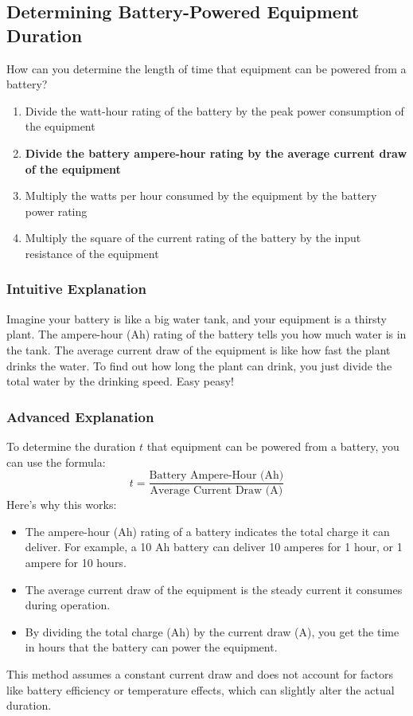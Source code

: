 \subsection{Determining Battery-Powered Equipment Duration}
\label{T4A09}

\begin{tcolorbox}[colback=gray!10!white,colframe=black!75!black,title=T4A09]
How can you determine the length of time that equipment can be powered from a battery?
\begin{enumerate}[label=\Alph*)]
    \item Divide the watt-hour rating of the battery by the peak power consumption of the equipment
    \item \textbf{Divide the battery ampere-hour rating by the average current draw of the equipment}
    \item Multiply the watts per hour consumed by the equipment by the battery power rating
    \item Multiply the square of the current rating of the battery by the input resistance of the equipment
\end{enumerate}
\end{tcolorbox}

\subsubsection{Intuitive Explanation}
Imagine your battery is like a big water tank, and your equipment is a thirsty plant. The ampere-hour (Ah) rating of the battery tells you how much water is in the tank. The average current draw of the equipment is like how fast the plant drinks the water. To find out how long the plant can drink, you just divide the total water by the drinking speed. Easy peasy!

\subsubsection{Advanced Explanation}
To determine the duration \( t \) that equipment can be powered from a battery, you can use the formula:
\[
t = \frac{\text{Battery Ampere-Hour (Ah)}}{\text{Average Current Draw (A)}}
\]
Here’s why this works:
\begin{itemize}
    \item The ampere-hour (Ah) rating of a battery indicates the total charge it can deliver. For example, a 10 Ah battery can deliver 10 amperes for 1 hour, or 1 ampere for 10 hours.
    \item The average current draw of the equipment is the steady current it consumes during operation.
    \item By dividing the total charge (Ah) by the current draw (A), you get the time in hours that the battery can power the equipment.
\end{itemize}
This method assumes a constant current draw and does not account for factors like battery efficiency or temperature effects, which can slightly alter the actual duration.

